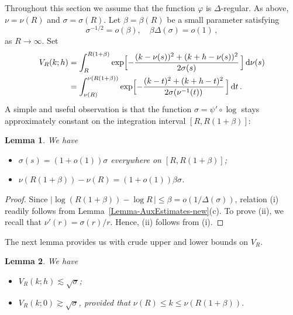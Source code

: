 \documentclass[10pt,a4paper]{amsart}
\newtheorem{lemma}{Lemma}
\begin{document}
Throughout this section we assume that the function $\varphi$ is $\Delta$-regular.
As above, $\nu=\nu(R)$ and $\sigma=\sigma(R)$. Let $\beta=\beta(R)$ be a small parameter
satisfying
\[
\sigma^{-1/2} = o(\beta), \quad
\beta\Delta(\sigma) = o(1)\,,
\]
as $R\to\infty$. Set
\begin{align*}
V_R(k; h) &= \int_R^{R(1+\beta)}
\exp\Bigl[ -\frac{(k-\nu(s))^2 + (k+h-\nu(s))^2}{2\sigma(s)}\, \Bigr]\, {\rm d}\nu(s) \\
&=
\int_{\nu(R)}^{\nu(R(1+\beta))}
\exp\Bigl[ -\frac{(k-t)^2 + (k+h-t)^2}{2\sigma(\nu^{-1}(t))}\, \Bigr]\, {\rm d}t\,.
\end{align*}
A simple and useful observation is that the function $\sigma = \psi'\circ\log $ stays
approximately constant on the integration interval $[R, R(1+\beta)]$:

\begin{lemma}\label{Lemma5A}
We have
\begin{itemize}
\item[{\rm (i)}]
$\sigma (s) = (1+o(1))\sigma $ everywhere on $[R, R(1+\beta)]$;
\item[{\rm (ii)}]
$\nu(R(1+\beta))-\nu (R) = (1+o(1))\beta\sigma$.
\end{itemize}
\end{lemma}

\begin{proof}
Since $|\log(R(1+\beta))-\log R \,| \le \beta = o(1/\Delta(\sigma))$,
relation (i) readily follows from Lemma~\ref{Lemma-AuxEstimates-new}(c).
To prove (ii), we recall that $\nu'(r) = \sigma (r)/r$. Hence,
(ii) follows from (i).
\end{proof}

The next lemma provides us with crude upper and lower bounds on $V_R$.

\begin{lemma}\label{Lemma5C}
We have
\begin{itemize}
\item[{\rm (i)}] $V_R(k; h)\lesssim \sqrt{\sigma}$;
\item[{\rm (ii)}] $V_R(k; 0) \gtrsim \sqrt{\sigma}$,
provided that  $\nu(R)\le k \le \nu(R(1+\beta))$.
\end{itemize}
\end{lemma}
\end{document}
